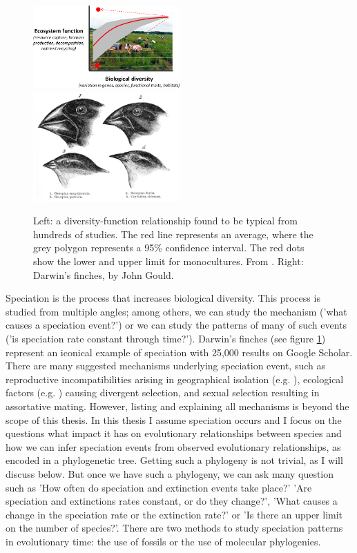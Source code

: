 \begin{figure}[H]
  \includegraphics[width=0.5\textwidth]{cardinale_et_al_fig_1.png}
  \includegraphics[width=0.5\textwidth]{Darwin's_finches_by_Gould.jpg}
  \caption{
    Left: a diversity-function relationship found to be typical from hundreds
    of studies. The red line represents an average, where the grey polygon
    represents a 95\% confidence interval. The red dots show the lower
    and upper limit for monocultures. From \cite{cardinale2012biodiversity}.
    Right: Darwin's finches, by John Gould.
  }
  \label{fig:cardinale_et_al_and_darwins_finches}
\end{figure}

Speciation is the process that increases biological diversity.
This process is studied from multiple angles; among others,
we can study the mechanism ('what
causes a speciation event?') or we can study the patterns of many
of such events ('is speciation rate constant through time?').
Darwin's finches (see figure \ref{fig:cardinale_et_al_and_darwins_finches}) 
represent an iconical example of speciation with 25,000 results on Google Scholar.
There are many suggested mechanisms underlying speciation event, such as reproductive incompatibilities arising in geographical isolation 
(e.g. \cite{mayr1942}), ecological factors (e.g. \cite{lack1947}) causing divergent selection, and sexual selection resulting in assortative mating. However, listing and explaining all mechanisms is beyond the scope of this thesis. In this thesis I assume speciation occurs and I focus on the questions what impact it has on evolutionary relationships between species and how we can infer speciation events from observed evolutionary relationships, as encoded in a phylogenetic tree. Getting such a phylogeny is not trivial, as I will discuss below. But once we have such a phylogeny, we can ask many question such 
as 'How often do speciation and extinction events take place?'
'Are speciation and extinctions rates constant, or do they change?',
'What causes a change in the speciation rate or the extinction rate?' or
'Is there an upper limit on the number of species?'. 
There are two methods to study speciation patterns in evolutionary time:
the use of fossils or the use of molecular phylogenies.

